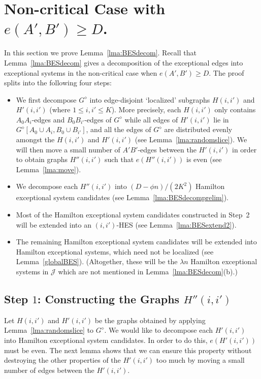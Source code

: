 \documentclass{memo-l}
\numberwithin{section}{chapter}
\numberwithin{equation}{section}
\numberwithin{firstthm}{section}
\numberwithin{figure}{section}
\begin{document}
{\section{Non-critical Case with $e(A',B') \ge D$.} \label{noncritical}
In this section we prove Lemma~\ref{lma:BESdecom}. Recall that Lemma~\ref{lma:BESdecom} gives a decomposition of the exceptional edges into exceptional systems in the non-critical case when $e(A',B') \ge D$.
The proof splits into the following four steps:
\begin{itemize}
	\item[\bf Step 1] We first decompose $G^{\diamond}$ into edge-disjoint `localized' subgraphs $H(i,i')$ and $H'(i,i')$ (where $1\le i,i' \le K$).
	More precisely, each $H(i,i')$ only contains $A_0A_i$-edges and $B_0B_{i'}$-edges of $G^\diamond$ while all edges of $H'(i,i')$
lie in $G^{\diamond}[A_0 \cup A_i,  B_0 \cup B_{i'}]$, and all the edges of $G^\diamond$ are distributed evenly amongst the $H(i,i')$ and $H'(i,i')$
(see Lemma~\ref{lma:randomslice}). 
We will then move a small number of $A'B'$-edges between the $H'(i,i')$ in order to obtain graphs $H''(i,i')$ such that $e(H''(i,i'))$ is even (see Lemma~\ref{lma:move}).
	\item[\bf Step 2] We decompose each $H''(i,i')$ into $(D - \phi n )/(2K^2)$ Hamilton exceptional system candidates (see Lemma~\ref{lma:BESdecomprelim}).
	\item[\bf Step 3] Most of the Hamilton exceptional system candidates constructed in Step~2 will be extended into an $(i,i')$-HES (see Lemma~\ref{lma:BESextend2}).
	\item[\bf Step 4] The remaining Hamilton exceptional system candidates will be extended into Hamilton exceptional systems, which need not be localized
	(see Lem\-ma~\ref{globalBES}).
	(Altogether, these will be the $\lambda n$ Hamilton exceptional systems in $\mathcal{J}$ which are not mentioned in Lemma~\ref{lma:BESdecom}(b).)
\end{itemize}

\subsection{Step $1$: Constructing the Graphs $H''(i,i')$}
Let $H(i,i')$ and $H'(i,i')$ be the graphs obtained by applying Lemma~\ref{lma:randomslice} to $G^{\diamond}$.
We would like to decompose each $H'(i,i')$ into Hamilton exceptional system candidates.
In order to do this, $e(H'(i,i'))$ must be even. The next lemma shows that we can ensure this property
without destroying the other properties of the $H'(i,i')$ too much by moving a small number of edges 
between the $H'(i,i')$.

}
\end{document}
